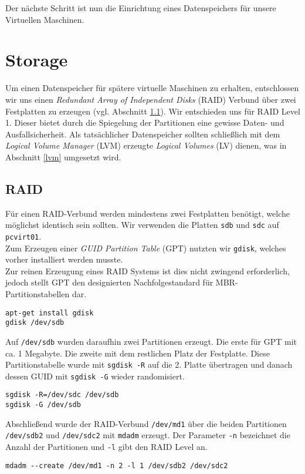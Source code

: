 Der nächste Schritt ist nun die Einrichtung eines Datenspeichers für unsere Virtuellen Maschinen.

\chapter{Storage}
Um einen Datenspeicher für spätere virtuelle Maschinen zu erhalten, entschlossen wir uns einen \emph{Redundant Array of Independent Disks} (RAID) Verbund über zwei Festplatten zu erzeugen (vgl. Abschnitt \ref{raid}). Wir entschieden uns für RAID Level 1. Dieser bietet durch die Spiegelung der Partitionen eine gewisse Daten- und Ausfallsicherheit. Als tatsächlicher Datenspeicher sollten schließlich mit dem \emph{Logical Volume Manager} (LVM) erzeugte \emph{Logical Volumes} (LV) dienen, was in Abschnitt \ref{lvm} umgesetzt wird.
\section{RAID}
\label{raid}
Für einen RAID-Verbund werden mindestens zwei Festplatten benötigt, welche möglichst identisch sein sollten. Wir verwenden die Platten \verb#sdb# und \verb#sdc# auf \verb#pcvirt01#. \\
Zum Erzeugen einer \emph{GUID Partition Table} (GPT) nutzten wir \verb#gdisk#, welches vorher installiert werden musste. \\ 
Zur reinen Erzeugung eines RAID Systems ist dies nicht zwingend erforderlich, jedoch stellt GPT den designierten Nachfolgestandard für MBR-Partitionstabellen dar. 
\begin{verbatim}
apt-get install gdisk
gdisk /dev/sdb
\end{verbatim}
Auf \verb#/dev/sdb# wurden daraufhin zwei Partitionen erzeugt. Die erste für GPT mit ca. 1 Megabyte. Die zweite mit dem restlichen Platz der Festplatte.
Diese Partitionstabelle wurde mit \verb#sgdisk -R# auf die 2. Platte übertragen und danach dessen GUID mit \verb#sgdisk -G# wieder randomisiert.
\begin{verbatim}
sgdisk -R=/dev/sdc /dev/sdb
sgdisk -G /dev/sdb
\end{verbatim}
Abschließend wurde der RAID-Verbund \verb#/dev/md1# über die beiden Partitionen \verb#/dev/sdb2# und \verb#/dev/sdc2# mit \verb#mdadm# erzeugt. Der Parameter \verb#-n# bezeichnet die Anzahl der Partitionen und \verb#-l# gibt den RAID Level an.
\begin{verbatim}
mdadm --create /dev/md1 -n 2 -l 1 /dev/sdb2 /dev/sdc2
\end{verbatim}
